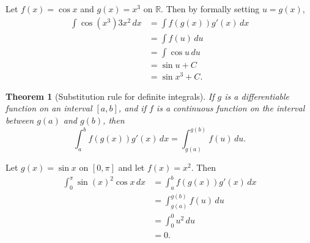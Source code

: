 \documentclass{article}
\theoremstyle{plain}
\newtheorem{theorem}{Theorem}
\begin{document}
\begin{example}
	Let $f(x) = \cos x$ and $g(x) = x^3$ on $\mathbb R$.
	Then by formally setting $u = g(x)$,
	\begin{align}
		\int \cos (x^3) 3x^2\,dx & = \int f(g(x))g'(x)\,dx \\
		                         & = \int f(u)\,du         \\
		                         & = \int \cos u \,du      \\
		                         & = \sin u + C            \\
		                         & = \sin x^3 + C.
	\end{align}
\end{example}
\begin{theorem}[Substitution rule for definite integrals]
	If $g$ is a differentiable function on an interval $[a,b]$, and if $f$ is a continuous function on the interval between $g(a)$ and $g(b)$, then
	\begin{equation}
		\int_a^b f(g(x))g'(x)\,dx = \int_{g(a)}^{g(b)}f(u)\,du.
	\end{equation}
\end{theorem}
\begin{example}
	Let $g(x) = \sin x$ on $[0,\pi]$ and let $f(x) = x^2$.
	Then
	\begin{align}
		\int_0^\pi \sin(x)^2\cos x\,dx & = \int_a^b f(g(x))g'(x)\,dx  \\
		                               & = \int_{g(a)}^{g(b)}f(u)\,du \\
		                               & = \int_0^0 u^2\,du           \\
		                               & = 0.
	\end{align}
\end{example}
\end{document}
